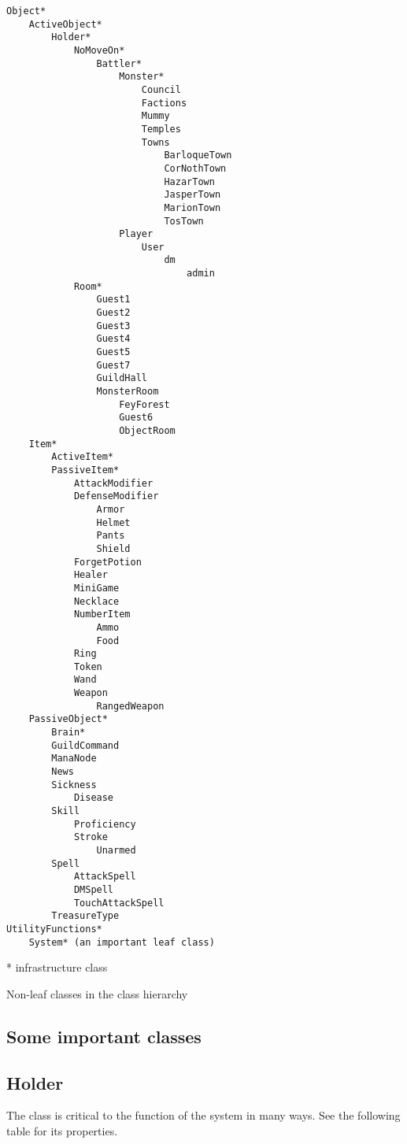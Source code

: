 \begin{verbatim}
Object*
    ActiveObject*
        Holder*
            NoMoveOn*
                Battler*
                    Monster*
                        Council
                        Factions
                        Mummy
                        Temples
                        Towns
                            BarloqueTown
                            CorNothTown
                            HazarTown
                            JasperTown
                            MarionTown
                            TosTown
                    Player
                        User
                            dm
                                admin
            Room*
                Guest1
                Guest2
                Guest3
                Guest4
                Guest5
                Guest7
                GuildHall
                MonsterRoom
                    FeyForest
                    Guest6
                    ObjectRoom
    Item*
        ActiveItem*
        PassiveItem*
            AttackModifier
            DefenseModifier
                Armor
                Helmet
                Pants
                Shield
            ForgetPotion
            Healer
            MiniGame
            Necklace
            NumberItem
                Ammo
                Food
            Ring
            Token
            Wand
            Weapon
                RangedWeapon
    PassiveObject*
        Brain*
        GuildCommand
        ManaNode
        News
        Sickness
            Disease
        Skill
            Proficiency
            Stroke
                Unarmed
        Spell
            AttackSpell
            DMSpell
            TouchAttackSpell
        TreasureType
UtilityFunctions*
    System* (an important leaf class)
\end{verbatim}
* infrastructure class

\begin{center}
Non-leaf classes in the class hierarchy
\end{center}

\subsection{Some important classes}

\subsection{Holder}

The  class is critical to the function of the system in
many ways.  See the following table for its properties.

